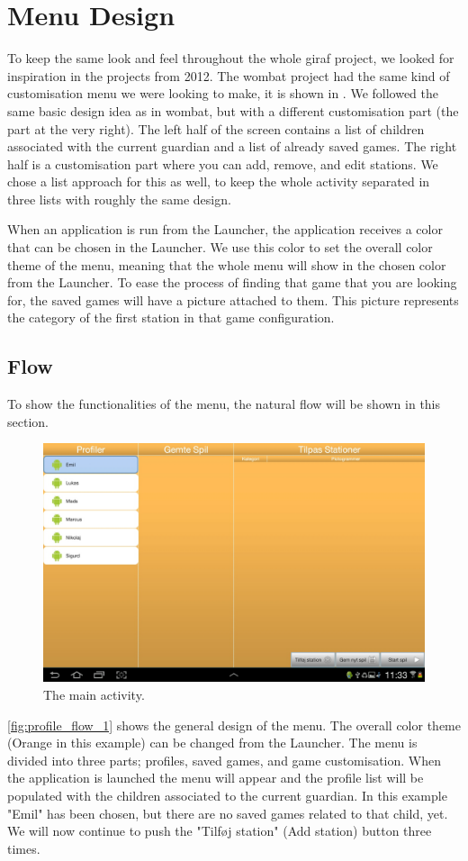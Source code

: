 \section{Menu Design}
\label{designmenu}
To keep the same look and feel throughout the whole \ac{giraf} project, we looked for inspiration in the projects from 2012. The \ac{wombat} project had the same kind of customisation menu we were looking to make, it is shown in . We followed the same basic design idea as in \ac{wombat}, but with a different customisation part (the part at the very right). The left half of the screen contains a list of children associated with the current guardian and a list of already saved games. The right half is a customisation part where you can add, remove, and edit stations. We chose a list approach for this as well, to keep the whole activity separated in three lists with roughly the same design.

When an application is run from the Launcher, the application receives a color that can be chosen in the Launcher. We use this color to set the overall color theme of the menu, meaning that the whole menu will show in the chosen color from the Launcher.
To ease the process of finding that game that you are looking for, the saved games will have a picture attached to them. This picture represents the category of the first station in that game configuration.

\subsection{Flow}
To show the functionalities of the menu, the natural flow will be shown in this section.
\begin{figure}[H]
\centering
\includegraphics[width=1.0\linewidth]{img/screenshots/profile_flow_1.jpg}%
\caption{The main activity.}
\label{fig:profile_flow_1}
\end{figure}
\autoref{fig:profile_flow_1} shows the general design of the menu. The overall color theme (Orange in this example) can be changed from the Launcher. The menu is divided into three parts; profiles, saved games, and game customisation. When the application is launched the menu will appear and the profile list will be populated with the children associated to the current guardian. In this example "Emil" has been chosen, but there are no saved games related to that child, yet.
We will now continue to push the "Tilføj station" (Add station) button three times.


